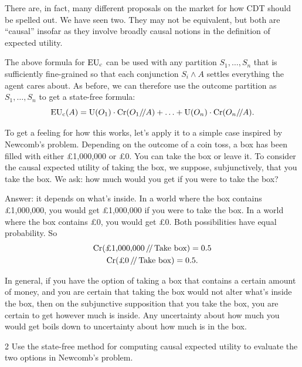 There are, in fact, many different proposals on the market for how CDT should be
spelled out. We have seen two. They may not be equivalent, but both are
``causal'' insofar as they involve broadly causal notions in the definition of
expected utility.

The above formula for $\text{EU}_\text{c}$ can be used with any partition
$S_{1},\ldots,S_{n}$ that is sufficiently fine-grained so that each conjunction
 $S_{i} \land A$ settles everything the agent cares about. As before, we can
therefore use the outcome partition as $S_{1},\ldots,S_{n}$ to get a state-free
formula:
\[
  \text{EU}_\text{c}(A) = \text{U}(O_1) \cdot \text{Cr}(O_1/\!/A) + \ldots + \text{U}(O_n) \cdot \text{Cr}(O_n/\!/A).
\]

To get a feeling for how this works, let's apply it to a simple case inspired by
Newcomb's problem. Depending on the outcome of a coin toss, a box has been
filled with either £1,000,000 or £0. You can take the box or leave it. To
consider the causal expected utility of taking the box, we suppose,
subjunctively, that you take the box. We ask: how much would you get if you were
to take the box?

Answer: it depends on what's inside. In a world where the box contains
£1,000,000, you would get £1,000,000 if you were to take the box. In a world
where the box contains £0, you would get £0. Both possibilities have equal
probability. So
\begin{gather*}
  \text{Cr}(\text{£1,000,000}\,/\!/\,\text{Take box}) = 0.5\\
  \text{Cr}(\text{£0}\,/\!/\,\text{Take box}) = 0.5.
\end{gather*}

In general, if you have the option of taking a box that contains a certain
amount of money, and you are certain that taking the box would not alter what's
inside the box, then on the subjunctive supposition that you take the box, you
are certain to get however much is inside. Any uncertainty about how much you
would get boils down to uncertainty about how much is in the box.

\begin{exercise}{2}
  Use the state-free method for computing causal expected utility to evaluate
  the two options in Newcomb's problem.
\end{exercise}


